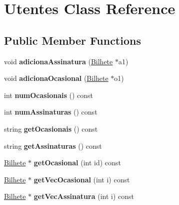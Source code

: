 \hypertarget{classUtentes}{}\section{Utentes Class Reference}
\label{classUtentes}
\subsection*{Public Member Functions}
\begin{DoxyCompactItemize}
\item 
\mbox{\label{classUtentes_ac82d734dc3308c4c96b19b0be9007156}} 
void {\bfseries adiciona\+Assinatura} (\mbox{\hyperlink{classBilhete}{Bilhete}} $\ast$a1)
\item 
\mbox{\label{classUtentes_a52420199f0b1d668f1e6cfb2a1dad6f3}} 
void {\bfseries adiciona\+Ocasional} (\mbox{\hyperlink{classBilhete}{Bilhete}} $\ast$o1)
\item 
\mbox{\label{classUtentes_a6ba3b2fd50b28d97bef683c91cb7b8ce}} 
int {\bfseries num\+Ocasionais} () const
\item 
\mbox{\label{classUtentes_a0495f362d01814bd804eda630fda9b94}} 
int {\bfseries num\+Assinaturas} () const
\item 
\mbox{\label{classUtentes_acf5f602ef4ebd923a472ce3c1001fbe1}} 
string {\bfseries get\+Ocasionais} () const
\item 
\mbox{\label{classUtentes_a9b3c0eee795d40dd75f28a728bfb972e}} 
string {\bfseries get\+Assinaturas} () const
\item 
\mbox{\label{classUtentes_a0d5c791ac2addd97e8eb1cb5ab2303c1}} 
\mbox{\hyperlink{classBilhete}{Bilhete}} $\ast$ {\bfseries get\+Ocasional} (int id) const
\item 
\mbox{\label{classUtentes_a0be646443005e589db8416297678787f}} 
\mbox{\hyperlink{classBilhete}{Bilhete}} $\ast$ {\bfseries get\+Vec\+Ocasional} (int i) const
\item 
\mbox{\label{classUtentes_a1485585f6f73166e933d1edf7e7a53c1}} 
\mbox{\hyperlink{classBilhete}{Bilhete}} $\ast$ {\bfseries get\+Vec\+Assinatura} (int i) const

\end{DoxyCompactItemize}
